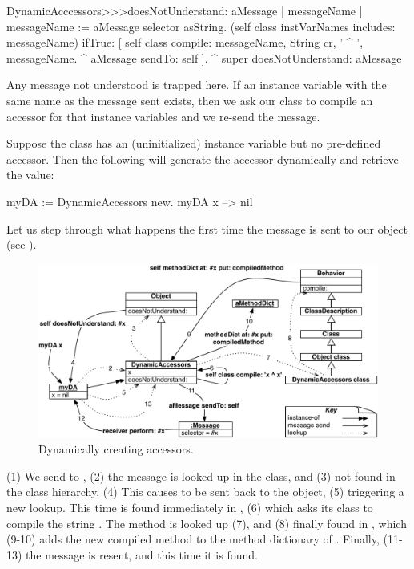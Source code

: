 \documentclass[a4paper,10pt,twoside]{book}
\begin{document}
\begin{code}{}
DynamicAcccessors>>>doesNotUnderstand: aMessage
        | messageName |
        messageName := aMessage selector asString.
        (self class instVarNames includes: messageName)
                ifTrue: [
                        self class compile: messageName, String cr, ' ^ ', messageName.
                        ^ aMessage sendTo: self ].
        ^ super doesNotUnderstand: aMessage
\end{code}
Any message not understood is trapped here. If an instance variable with the same name as the message sent exists, then we ask our class to compile an accessor for that instance variables and we re-send the message.

Suppose the class  has an (uninitialized) instance variable  but no pre-defined accessor. Then the following will generate the accessor dynamically and retrieve the value:
\begin{code}{}
myDA := DynamicAccessors new.
myDA x --> nil
\end{code}

Let us step through what happens the first time the message  is sent to our object (see ).

\begin{figure}[ht]\centering
        \includegraphics[width=\linewidth]{DynamicAccessors}
        \caption{Dynamically creating accessors.}
\end{figure}

(1) We send  to , (2) the message is looked up in the class, and (3) not found in the class hierarchy. (4) This causes  to be sent back to the object, (5) triggering a new lookup. This time  is found immediately in , (6) which asks its class to compile the string . The  method is looked up (7), and (8) finally found in , which (9-10) adds the new compiled method to the method dictionary of . Finally, (11-13) the message is resent, and this time it is found.
\end{document}
